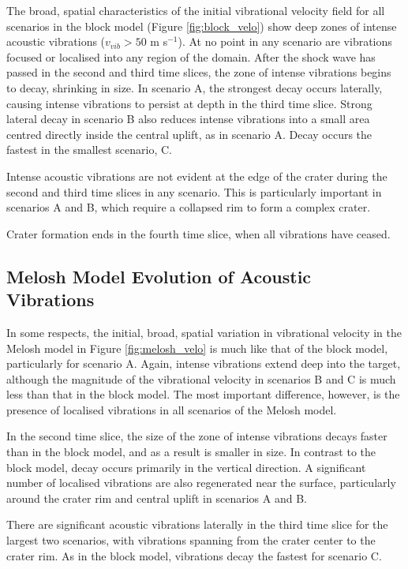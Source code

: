 The broad, spatial characteristics of the initial vibrational velocity field for all scenarios in the block model (Figure \ref{fig:block_velo}) show deep zones of intense acoustic vibrations ($v_{vib} > 50$ m s$^{-1}$). At no point in any scenario are vibrations focused or localised into any region of the domain. After the shock wave has passed in the second and third time slices, the zone of intense vibrations  begins to decay, shrinking in size. In scenario A, the strongest decay occurs laterally, causing intense vibrations to persist at depth in the third time slice. Strong lateral decay in scenario B also reduces intense vibrations into a small area centred directly inside the central uplift, as in scenario A. Decay occurs the fastest in the smallest scenario, C. 

Intense acoustic vibrations are not evident at the edge of the crater during the second and third time slices in any scenario. This is particularly important in scenarios A and B, which require a collapsed rim to form a complex crater.

Crater formation ends in the fourth time slice, when all vibrations have ceased.

\subsection{Melosh Model Evolution of Acoustic Vibrations}\label{sec:meloshvelo}

In some respects, the initial, broad, spatial variation in vibrational velocity in the Melosh model in Figure \ref{fig:melosh_velo} is much like that of the block model, particularly for scenario A. Again, intense vibrations extend deep into the target, although the magnitude of the vibrational velocity in scenarios B and C is much less than that in the block model. The most important difference, however, is the presence of localised vibrations in all scenarios of the Melosh model. 

In the second time slice, the size of the zone of intense vibrations decays faster than in the block model, and as a result is smaller in size. In contrast to the block model, decay occurs primarily in the vertical direction. A significant number of localised vibrations are also regenerated near the surface, particularly around the crater rim and central uplift in scenarios A and B.

There are significant acoustic vibrations laterally in the third time slice for the largest two scenarios, with vibrations spanning from the crater center to the crater rim. As in the block model, vibrations decay the fastest for scenario C.


